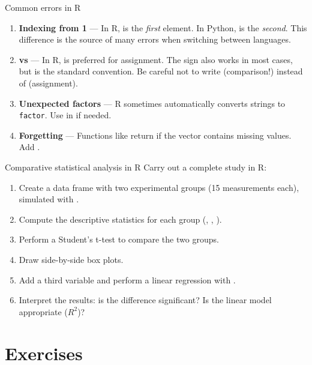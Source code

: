 \begin{errmark}{Common errors in R}
\begin{enumerate}
  \item \textbf{Indexing from 1} --- In R,  is the
    \emph{first} element. In Python,  is the \emph{second}. This difference
    is the source of many errors when switching between languages.
  \item \textbf{\ri{<-} vs \ri{=}} --- In R, \ri{<-} is preferred for assignment.
    The \ri{=} sign also works in most cases, but \ri{<-} is the
    standard convention. Be careful not to write  (comparison!) instead
    of  (assignment).
  \item \textbf{Unexpected factors} --- R sometimes automatically converts strings
    to \texttt{factor}. Use  in
     if needed.
  \item \textbf{Forgetting } --- Functions like  return
     if the vector contains missing values. Add .
\end{enumerate}
\end{errmark}

\begin{projet}{Comparative statistical analysis in R}
Carry out a complete study in R:
\begin{enumerate}
  \item Create a data frame with two experimental groups (15 measurements each),
    simulated with .
  \item Compute the descriptive statistics for each group (, ,
    ).
  \item Perform a Student's t-test to compare the two groups.
  \item Draw side-by-side box plots.
  \item Add a third variable and perform a linear regression with .
  \item Interpret the results: is the difference significant?
    Is the linear model appropriate ($R^2$)?
\end{enumerate}
\end{projet}

\section{Exercises}

